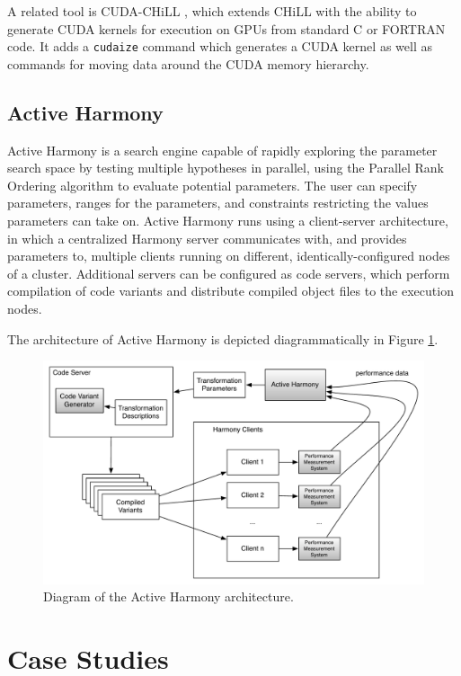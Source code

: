 \documentclass[msthesis,justified,copyright,final,numbers,sort&compress,
gsmodern,amstex,natbib]{uothesis}
\begin{document}
A related tool is CUDA-CHiLL \cite{rudy}, which extends CHiLL with the ability to generate CUDA kernels for execution on GPUs from standard C or FORTRAN code. It adds a \texttt{cudaize} command which generates a CUDA kernel as well as commands for moving data around the CUDA memory hierarchy.

\subsection{Active Harmony}

Active Harmony \cite{harmony} is a search engine capable of rapidly exploring the parameter search space by testing multiple hypotheses in parallel, using the Parallel Rank Ordering algorithm to evaluate potential parameters. The user can specify parameters, ranges for the parameters, and constraints restricting the values parameters can take on. Active Harmony runs using a client-server architecture, in which a centralized Harmony server communicates with, and provides parameters to, multiple clients running on different, identically-configured nodes of a cluster. Additional servers can be configured as code servers, which perform compilation of code variants and distribute compiled object files to the execution nodes.

The architecture of Active Harmony is depicted diagrammatically in Figure \ref{fig:harmony}. 

\begin{figure}[tbp]
\centering
\includegraphics[width=\textwidth]{harmony.pdf}
\caption{Diagram of the Active Harmony architecture.}
\label{fig:harmony}
\end{figure}

\section{Case Studies}
\end{document}
